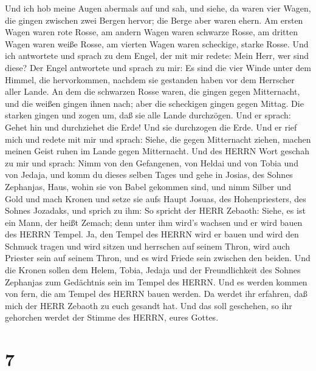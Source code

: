  Und ich hob meine Augen abermals auf und sah, und siehe, da
waren vier Wagen, die gingen zwischen zwei Bergen hervor; die Berge aber
waren ehern.  Am ersten Wagen waren rote Rosse, am andern
Wagen waren schwarze Rosse,  am dritten Wagen waren weiße
Rosse, am vierten Wagen waren scheckige, starke Rosse.  Und
ich antwortete und sprach zu dem Engel, der mit mir redete: Mein Herr,
wer sind diese?  Der Engel antwortete und sprach zu mir: Es
sind die vier Winde unter dem Himmel, die hervorkommen, nachdem sie
gestanden haben vor dem Herrscher aller Lande.  An dem die
schwarzen Rosse waren, die gingen gegen Mitternacht, und die weißen
gingen ihnen nach; aber die scheckigen gingen gegen Mittag. 
Die starken gingen und zogen um, daß sie alle Lande durchzögen. Und er
sprach: Gehet hin und durchziehet die Erde! Und sie durchzogen die Erde.
 Und er rief mich und redete mit mir und sprach: Siehe, die
gegen Mitternacht ziehen, machen meinen Geist ruhen im Lande gegen
Mitternacht.  Und des HERRN Wort geschah zu mir und sprach:
 Nimm von den Gefangenen, von Heldai und von Tobia und von
Jedaja, und komm du dieses selben Tages und gehe in Josias, des Sohnes
Zephanjas, Haus, wohin sie von Babel gekommen sind,  und
nimm Silber und Gold und mach Kronen und setze sie aufs Haupt Josuas,
des Hohenpriesters, des Sohnes Jozadaks,  und sprich zu
ihm: So spricht der HERR Zebaoth: Siehe, es ist ein Mann, der heißt
Zemach; denn unter ihm wird's wachsen und er wird bauen des HERRN
Tempel.  Ja, den Tempel des HERRN wird er bauen und wird
den Schmuck tragen und wird sitzen und herrschen auf seinem Thron, wird
auch Priester sein auf seinem Thron, und es wird Friede sein zwischen
den beiden.  Und die Kronen sollen dem Helem, Tobia, Jedaja
und der Freundlichkeit des Sohnes Zephanjas zum Gedächtnis sein im
Tempel des HERRN.  Und es werden kommen von fern, die am
Tempel des HERRN bauen werden. Da werdet ihr erfahren, daß mich der HERR
Zebaoth zu euch gesandt hat. Und das soll geschehen, so ihr gehorchen
werdet der Stimme des HERRN, eures Gottes.

\hypertarget{section-6}{%
\section{7}\label{section-6}}

